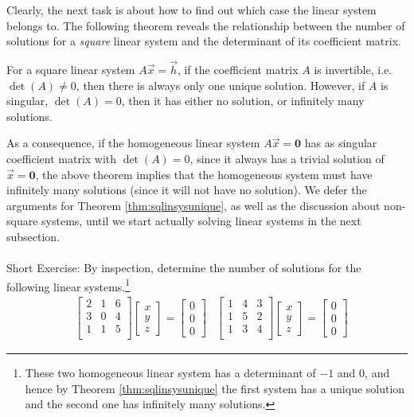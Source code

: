 Clearly, the next task is about how to find out which case the linear system belongs to. The following theorem reveals the relationship between the number of solutions for a \textit{square} linear system and the determinant of its coefficient matrix.
\begin{thm}
\label{thm:sqlinsysunique}
For a square linear system $A\vec{x} = \vec{h}$, if the coefficient matrix $A$ is invertible, i.e.\ $\det(A) \neq 0$, then there is always only one unique solution. However, if $A$ is singular, $\det(A) = 0$, then it has either no solution, or infinitely many solutions.
\end{thm}
As a consequence, if the homogeneous linear system $A\vec{x} = \textbf{0}$ has as singular coefficient matrix with $\det(A) = 0$, since it always has a trivial solution of $\vec{x} = \textbf{0}$, the above theorem implies that the homogeneous system must have infinitely many solutions (since it will not have no solution). We defer the arguments for Theorem \ref{thm:sqlinsysunique}, as well as the discussion about non-square systems, until we start actually solving linear systems in the next subsection. \\
\\
Short Exercise: By inspection, determine the number of solutions for the following linear systems.\footnote{These two homogeneous linear system has a determinant of $-1$ and $0$, and hence by Theorem \ref{thm:sqlinsysunique} the first system has a unique solution and the second one has infinitely many solutions.}
\begin{align*}
&
\begin{bmatrix}
2 & 1 & 6 \\
3 & 0 & 4 \\
1 & 1 & 5 \\
\end{bmatrix}
\begin{bmatrix}
x \\
y \\
z
\end{bmatrix}
=
\begin{bmatrix}
0 \\
0 \\
0
\end{bmatrix}
&
\begin{bmatrix}
1 & 4 & 3 \\
1 & 5 & 2 \\
1 & 3 & 4 \\
\end{bmatrix}
\begin{bmatrix}
x \\
y \\
z
\end{bmatrix}
=
\begin{bmatrix}
0 \\
0 \\
0
\end{bmatrix}
\end{align*}

